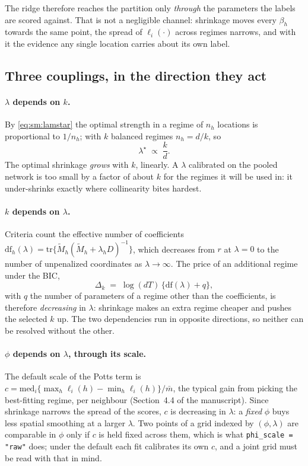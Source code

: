 \documentclass[11pt]{article}
\begin{document}
The ridge therefore reaches the partition only \emph{through} the parameters the labels are scored against. That is not a negligible channel: shrinkage moves every $\beta_h$ towards the same point, the spread of $\ell_i(\cdot)$ across regimes narrows, and with it the evidence any single location carries about its own label.

\subsection{Three couplings, in the direction they act}

\paragraph{$\lambda$ depends on $k$.} By \eqref{eq:sm:lamstar} the optimal strength in a regime of $n_h$ locations is proportional to $1/n_h$; with $k$ balanced regimes $n_h = d/k$, so
\begin{equation}\label{eq:sm:lamk}
  \lambda^\star \;\propto\; \frac{k}{d} .
\end{equation}
The optimal shrinkage \emph{grows} with $k$, linearly. A $\lambda$ calibrated on the pooled network is too small by a factor of about $k$ for the regimes it will be used in: it under-shrinks exactly where collinearity bites hardest.

\paragraph{$k$ depends on $\lambda$.} Criteria count the effective number of coefficients $\mathrm{df}_h(\lambda) = \mathrm{tr}\{\tilde M_h(\tilde M_h + \lambda_h D)^{-1}\}$, which decreases from $r$ at $\lambda = 0$ to the number of unpenalized coordinates as $\lambda \to\infty$. The price of an additional regime under the BIC,
\begin{equation}\label{eq:sm:margk}
  \Delta_k \;=\; \log(dT)\,\bigl\{\mathrm{df}(\lambda) + q\bigr\},
\end{equation}
with $q$ the number of parameters of a regime other than the coefficients, is therefore \emph{decreasing} in $\lambda$: shrinkage makes an extra regime cheaper and pushes the selected $k$ up. The two dependencies run in opposite directions, so neither can be resolved without the other.

\paragraph{$\phi$ depends on $\lambda$, through its scale.} The default scale of the Potts term is $c = \mathrm{med}_i\{\max_h\ell_i(h) - \min_h\ell_i(h)\}/\bar m$, the typical gain from picking the best-fitting regime, per neighbour (Section~4.4 of the manuscript). Since shrinkage narrows the spread of the scores, $c$ is decreasing in $\lambda$: a \emph{fixed} $\phi$ buys less spatial smoothing at a larger $\lambda$. Two points of a grid indexed by $(\phi,\lambda)$ are comparable in $\phi$ only if $c$ is held fixed across them, which is what \texttt{phi\_scale = "raw"} does; under the default each fit calibrates its own $c$, and a joint grid must be read with that in mind.
\end{document}
